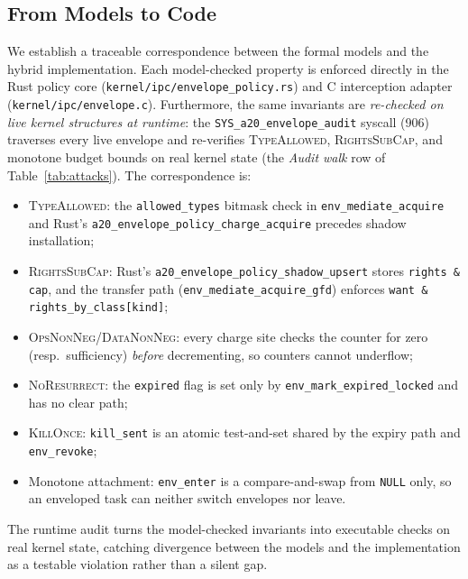\documentclass[letterpaper,twocolumn,10pt]{article}
\begin{document}
\subsection{From Models to Code}
\label{sec:trace}

We establish a traceable correspondence between the formal models and the
hybrid implementation.  Each model-checked property is enforced directly in the
Rust policy core (\texttt{kernel/ipc/envelope\_policy.rs}) and C interception
adapter (\texttt{kernel/ipc/envelope.c}).  Furthermore, the same invariants are
\emph{re-checked on live kernel structures at runtime}: the
\texttt{SYS\_a20\_envelope\_audit} syscall (906) traverses every live envelope
and re-verifies \textsc{TypeAllowed}, \textsc{RightsSubCap}, and monotone
budget bounds on real kernel state (the \emph{Audit walk} row of
Table~\ref{tab:attacks}).  The correspondence is:

\begin{itemize}
\item \textsc{TypeAllowed}: the \texttt{allowed\_types} bitmask check in
      \texttt{env\_mediate\_acquire} and Rust's \texttt{a20\_envelope\_policy\_charge\_acquire}
      precedes shadow installation;
\item \textsc{RightsSubCap}: Rust's \texttt{a20\_envelope\_policy\_shadow\_upsert}
      stores \texttt{rights \& cap}, and the transfer path
      (\texttt{env\_mediate\_acquire\_gfd}) enforces
      \texttt{want \& rights\_by\_class[kind]};
\item \textsc{OpsNonNeg}/\textsc{DataNonNeg}: every charge site checks
      the counter for zero (resp.~sufficiency) \emph{before}
      decrementing, so counters cannot underflow;
\item \textsc{NoResurrect}: the \texttt{expired} flag is set only by
      \texttt{env\_mark\_expired\_locked} and has no clear path;
\item \textsc{KillOnce}: \texttt{kill\_sent} is an atomic test-and-set
      shared by the expiry path and \texttt{env\_revoke};
\item Monotone attachment: \texttt{env\_enter} is a compare-and-swap
      from \texttt{NULL} only, so an enveloped task can neither switch
      envelopes nor leave.
\end{itemize}

The runtime audit turns the model-checked invariants into executable
checks on real kernel state, catching divergence between the models and
the implementation as a testable violation rather than a silent gap.
\end{document}
